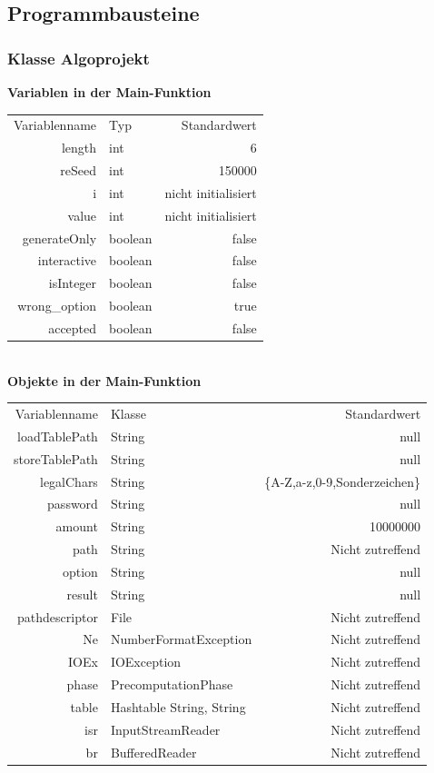 \documentclass[11pt]{article}
\begin{document}
  \subsection{Programmbausteine}
  \subsubsection{Klasse Algoprojekt}

  \textbf{Variablen in der Main-Funktion}\\
  \begin{tabular}{rlr}
  Variablenname & Typ & Standardwert \\
  length & int & 6 \\
  reSeed & int & 150000 \\
  i & int & nicht initialisiert \\
  value & int & nicht initialisiert \\
  generateOnly & boolean & false \\
  interactive & boolean & false \\
  isInteger & boolean & false \\
  wrong\_option & boolean & true \\
  accepted & boolean & false \\
  
  \end{tabular}\\
  \textbf{Objekte in der Main-Funktion}\\
  \begin{tabular}{rlr}
  Variablenname & Klasse & Standardwert \\
    loadTablePath & String & null \\
  storeTablePath & String & null \\
  legalChars & String & \{A-Z,a-z,0-9,Sonderzeichen\} \\
  password & String & null \\
  amount & String & 10000000 \\
  path & String & Nicht zutreffend \\
  option & String & null \\
  result & String & null \\
  pathdescriptor & File & Nicht zutreffend\\
  Ne & NumberFormatException & Nicht zutreffend \\
  IOEx & IOException & Nicht zutreffend \\
  phase & PrecomputationPhase & Nicht zutreffend \\
  table & Hashtable String, String & Nicht zutreffend \\
  isr & InputStreamReader & Nicht zutreffend \\
  br & BufferedReader & Nicht zutreffend \\
  
  \end{tabular}
\end{document}

